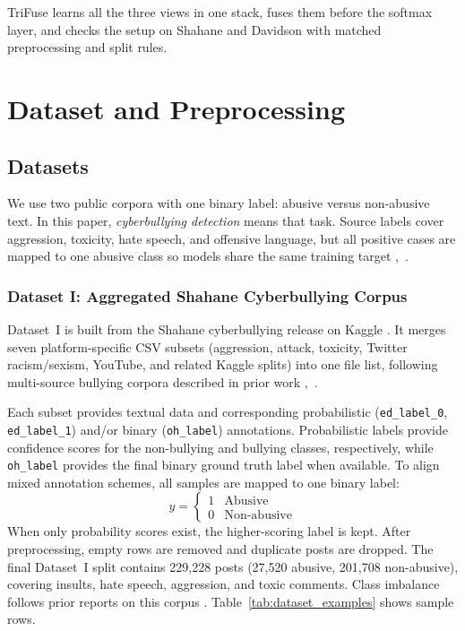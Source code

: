 TriFuse learns all the three views in one stack, fuses them before the softmax layer, and checks the setup on Shahane and Davidson with matched preprocessing and split rules.

\section{Dataset and Preprocessing}

\subsection{Datasets}

We use two public corpora with one binary label: abusive versus non-abusive text. In this paper, \emph{cyberbullying detection} means that task. Source labels cover aggression, toxicity, hate speech, and offensive language, but all positive cases are mapped to one abusive class so models share the same training target \cite{ref12},~\cite{ref13}.

\subsubsection{Dataset I: Aggregated Shahane Cyberbullying Corpus}
Dataset~I is built from the Shahane cyberbullying release on Kaggle \cite{ref10}. It merges seven platform-specific CSV subsets (aggression, attack, toxicity, Twitter racism/sexism, YouTube, and related Kaggle splits) into one file list, following multi-source bullying corpora described in prior work \cite{ref12},~\cite{ref27}.

Each subset provides textual data and corresponding probabilistic (\texttt{ed\_label\_0}, \texttt{ed\_label\_1}) and/or binary (\texttt{oh\_label}) annotations. Probabilistic labels provide confidence scores for the non-bullying and bullying classes, respectively, while \texttt{oh\_label} provides the final binary ground truth label when available. To align mixed annotation schemes, all samples are mapped to one binary label:
\begin{equation}
y =
\begin{cases}
1 & \text{Abusive} \\
0 & \text{Non-abusive}
\end{cases}
\end{equation}
When only probability scores exist, the higher-scoring label is kept. After preprocessing, empty rows are removed and duplicate posts are dropped. The final Dataset~I split contains 229,228 posts (27,520 abusive, 201,708 non-abusive), covering insults, hate speech, aggression, and toxic comments. Class imbalance follows prior reports on this corpus \cite{ref12}. Table~\ref{tab:dataset_examples} shows sample rows.

